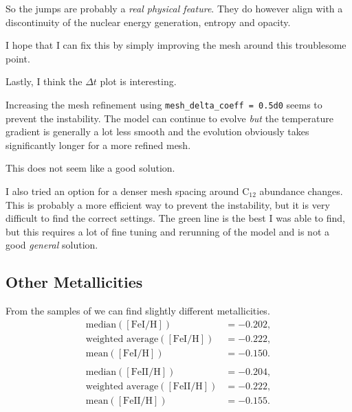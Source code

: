 \documentclass[a4paper,10pt]{article}
\begin{document}
So the jumps are probably a \emph{real physical feature}. They do however align with a discontinuity of the nuclear energy generation, entropy and opacity. 

I hope that I can fix this by simply improving the mesh around this troublesome point.

Lastly, I think the \(\Delta t\) plot is interesting.

\begin{figure}[ht]
    \centering
\end{figure}



Increasing the mesh refinement using \lstinline[style=output, breaklines=true]|mesh_delta_coeff = 0.5d0| seems to prevent the instability. The model can continue to evolve \emph{but} the temperature gradient is generally a lot less smooth and the evolution obviously takes significantly longer for a more refined mesh.

\begin{figure}[ht]
    \centering
\end{figure}

This does not seem like a good solution.

I also tried an option for a denser mesh spacing around \(\text{C}_{12}\) abundance changes. This is probably a more efficient way to prevent the instability, but it is very difficult to find the correct settings. The green line is the best I was able to find, but this requires a lot of fine tuning and rerunning of the model and is not a good \emph{general} solution. 

\subsection{Other Metallicities}

From the samples of \citet{castro2016} we can find slightly different metallicities.
\begin{align*}
    \text{median}([\text{FeI/H} ]) &= -0.202,\\
    \text{weighted average}([\text{FeI/H} ]) &= -0.222,\\
    \text{mean}([\text{FeI/H} ]) &= -0.150.\\
    &\\
    \text{median}([\text{FeII/H} ]) &= -0.204,\\
    \text{weighted average}([\text{FeII/H} ]) &= -0.222,\\
    \text{mean}([\text{FeII/H} ]) &= -0.155.
\end{align*}
\end{document}
